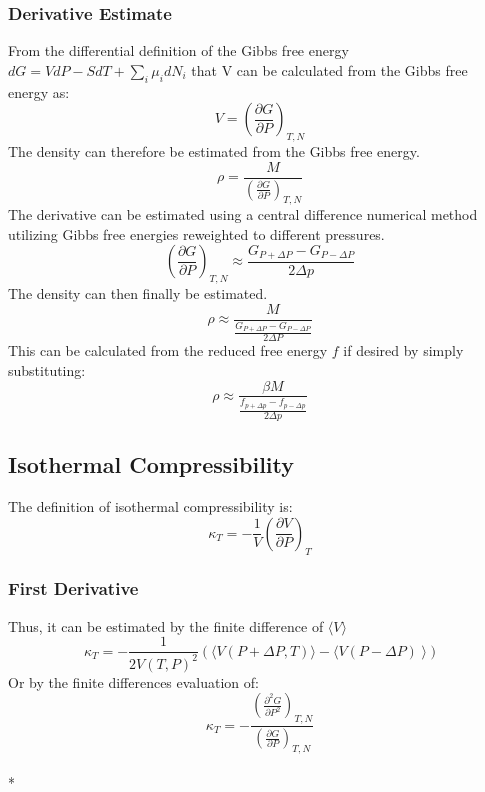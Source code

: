 \documentclass[a4paper,12pt]{article}
\begin{document}
\subsubsection{Derivative Estimate}
 From the differential definition of the Gibbs free energy $dG = VdP -SdT + \sum_i \mu_i dN_i$ that V can be calculated from the Gibbs free energy as:
\begin{equation} V = \left( \frac{\partial G}{\partial P} \right)_{T,N} \end{equation}
 The density can therefore be estimated from the Gibbs free energy.
\begin{equation} \rho = \frac{M}{ \left( \frac{\partial G}{\partial P} \right)_{T,N}} \end{equation}
 The derivative can be estimated using a central difference numerical method utilizing Gibbs free energies reweighted to different pressures.
\begin{equation} \left( \frac{\partial G}{\partial P} \right)_{T,N} \approx \frac{G_{P + \Delta P} - G_{P-\Delta P}}{2\Delta p} \end{equation}
 The density can then finally be estimated.
\begin{equation} \rho \approx \frac{M}{\frac{G_{P + \Delta P} - G_{P-\Delta P}}{2\Delta P}} \end{equation}
This can be calculated from the reduced free energy $f$ if desired by simply substituting:
\begin{equation} \rho \approx \frac{\beta M}{\frac{f_{p + \Delta p} - f_{p-\Delta p}}{2\Delta p}} \end{equation}

\subsection{Isothermal Compressibility}
 The definition of isothermal compressibility is:
\begin{equation}\kappa_T = -\frac{1}{V} \left(\frac{\partial V}{\partial P}\right)_T \end{equation}
\subsubsection{First Derivative}
Thus, it can be estimated by the finite difference of $\langle V \rangle$
\begin{equation}\kappa_T = -\frac{1}{2V(T,P)^2} \left(\langle V(P+\Delta P,T)\rangle - \langle V(P-\Delta P)\right\rangle) \end{equation}
Or by the finite differences evaluation of:
\begin{equation}\kappa_T = -\frac{\left(\frac{\partial^2 G}{\partial P^2}\right)_{T, N}}{\left(\frac{\partial G}{\partial P}\right)_{T, N}}\end{equation}\\*
\end{document}
